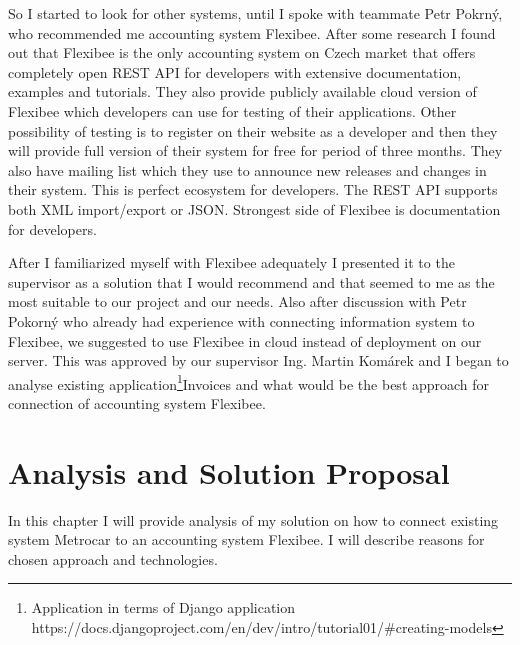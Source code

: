 \documentclass[11pt,twoside,a4paper]{book}
\begin{document}
So I started to look for other systems, until I spoke with teammate Petr
Pokrný, who recommended me accounting system Flexibee\cite{flexibee}. After some research I found out that Flexibee is 
the only accounting system on Czech market that offers completely open REST API for developers with extensive documentation, examples and tutorials. They also provide publicly available cloud version of Flexibee which developers can use for testing of their applications. Other possibility of testing is to register on their website as a developer and then they will provide full version of their system for free for period of three months. They also have mailing list which they use to announce new releases and changes in their system. This is perfect ecosystem for developers. The REST API supports both XML import/export or JSON. Strongest side of Flexibee is documentation for developers. 

After I familiarized myself with Flexibee adequately I presented it to the supervisor as a solution that I would recommend and that seemed to me as the most suitable to our project and our needs. Also after discussion with Petr Pokorný who already had experience with connecting information system to Flexibee, we suggested to use Flexibee in cloud instead of deployment on our server. This was approved by our supervisor Ing. Martin Komárek and I began to analyse existing application\footnote{Application in terms of Django application https://docs.djangoproject.com/en/dev/intro/tutorial01/\#creating-models}Invoices and what would be the best approach for connection of accounting system Flexibee. 


\chapter{Analysis and Solution Proposal}
In this chapter I will provide analysis of my solution on how to connect existing system Metrocar to an accounting system Flexibee. I will describe reasons for chosen approach and technologies.
\end{document}
